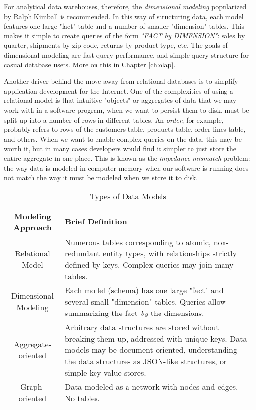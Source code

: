 \documentclass[11pt]{book}
\newcommand{\term}[1]{\emph{#1}} %
\newcommand{\head}[1]{\textnormal{\textbf{#1}}} %
\begin{document}
For analytical data warehouses, therefore, the \term{dimensional modeling} popularized by Ralph Kimball is recommended.  In this way of structuring data, each model features one large "fact" table and a number of smaller "dimension" tables.  This makes it simple to create queries of the form \emph{"FACT by DIMENSION"}: sales by quarter, shipments by zip code, returns by product type, etc.  The goals of dimensional modeling are fast query performance, and simple query structure for casual database users.  More on this in Chapter \ref{ch:olap}.

Another driver behind the move away from relational databases is to simplify application development for the Internet.  One of the complexities of using a relational model is that intuitive "objects" or aggregates of data that we may work with in a software program, when we want to persist them to disk, must be split up into a number of rows in different tables.  An \emph{order}, for example, probably refers to rows of the customers table, products table, order lines table, and others.  When we want to enable complex queries on the data, this may be worth it, but in many cases developers would find it simpler to just store the entire aggregate in one place.  This is known as the \term{impedance mismatch} problem: the way data is modeled in computer memory when our software is running does not match the way it must be modeled when we store it to disk.

\begin{table}
\centering
\caption{Types of Data Models}
\vspace{10pt}
\begin{tabular}{cp{8cm}}
    \toprule[1.5pt]
    \head{Modeling Approach} & \head{Brief Definition} \\
    \midrule
    Relational Model & Numerous tables corresponding to atomic, non-redundant entity types, with relationships strictly defined by keys. Complex queries may join many tables.\\
    \midrule
    Dimensional Modeling & Each model (schema) has one large "fact" and several small "dimension" tables. Queries allow summarizing the fact \emph{by} the dimensions.\\
    \midrule
    Aggregate-oriented & Arbitrary data structures are stored without breaking them up, addressed with unique keys. Data models may be document-oriented, understanding the data structures as JSON-like structures, or simple key-value stores. \\
    \midrule
    Graph-oriented & Data modeled as a network with nodes and edges. No tables. \\
    \bottomrule[1.5pt]
\end{tabular}
\end{table}
\end{document}
